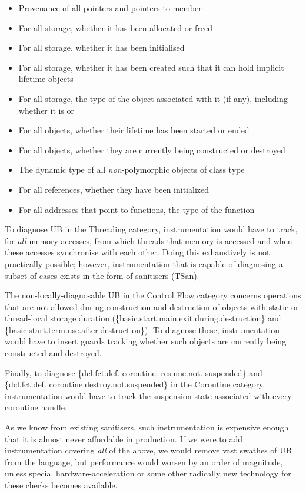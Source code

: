 {\begin{itemize}
\item Provenance of all pointers and pointers-to-member
\item For all storage, whether it has been allocated or freed
\item For all storage, whether it has been initialised
\item For all storage, whether it has been created such that it can hold implicit lifetime objects
\item For all storage, the type of the object associated with it (if any), including whether it is  or 
\item For all objects, whether their lifetime has been started or ended
\item For all objects, whether they are currently being constructed or destroyed
\item The dynamic type of all \emph{non}-polymorphic objects of class type
\item For all references, whether they have been initialized
\item For all addresses that point to  functions, the type of the function
\end{itemize}

To diagnose UB in the Threading category, instrumentation would have to track, for \emph{all} memory accesses, from which threads that memory is accessed and when these accesses synchronise with each other. Doing this exhaustively is not practically possible; however, instrumentation that is capable of diagnosing a subset of cases exists in the form of sanitisers (TSan).

The non-locally-diagnosable UB in the Control Flow category concerns operations that are not allowed during construction and destruction of objects with static or thread-local storage duration (\{basic.start.main.exit.during.destruction\} and \{basic.start.term.use.after.destruction\}). To diagnose these, instrumentation would have to insert guards tracking whether such objects are currently being constructed and destroyed.  

Finally, to diagnose \{dcl.fct.def. coroutine. resume.not. suspended\} and \{{dcl.fct.def.
coroutine.destroy.not.suspended}\} in the Coroutine category, instrumentation would have to track the suspension state associated with every coroutine handle.

As we know from existing sanitisers, such instrumentation is expensive enough that it is almost never affordable in production. If we were to add instrumentation covering \emph{all} of the above, we would remove vast swathes of UB from the language, but performance would worsen by an order of magnitude, unless special hardware-acceleration or some other radically new technology for these checks becomes available.

}
